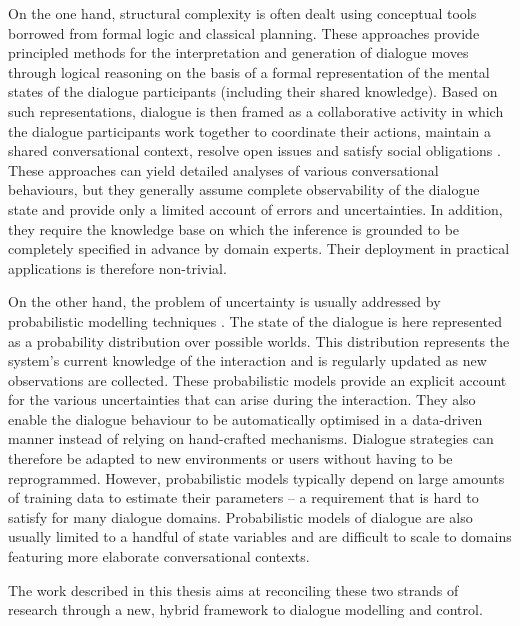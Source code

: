 On the one hand, structural complexity is often dealt using conceptual tools borrowed from formal logic and classical planning.  These approaches provide principled methods for the interpretation and generation of dialogue moves through logical reasoning on the basis of a formal representation of the mental states of the dialogue participants (including their shared knowledge). Based on such representations, dialogue is then framed as a collaborative activity in which the dialogue participants work together to coordinate their actions, maintain a shared conversational context, resolve open issues and satisfy social obligations  \citep{Allen:2000:AGD:973935.973937,larsson2002,Jokinen:2009}. These approaches can yield detailed analyses of various conversational behaviours, but they generally assume complete observability of the dialogue state and provide only a limited account of errors and uncertainties. In addition, they require the knowledge base on which the inference is grounded to be completely specified in advance by domain experts.  Their deployment in practical applications is therefore non-trivial. 

On the other hand, the problem of uncertainty is usually addressed by probabilistic modelling techniques \citep{Roy:2000,FramptonL09,Young:2010}.  The state of the dialogue is here represented as a probability distribution over possible worlds.  This distribution represents the system's current knowledge of the interaction and is regularly updated as new observations are collected. These probabilistic models provide an explicit account for the various uncertainties that can arise during the interaction. They also enable the dialogue behaviour to be automatically optimised in a data-driven manner instead of relying on hand-crafted mechanisms.  Dialogue strategies can therefore be adapted to new environments or users without having to be reprogrammed. However, probabilistic models typically depend on large amounts of training data to estimate their parameters -- a requirement that is hard to satisfy for many dialogue domains.  Probabilistic models of dialogue are also usually limited to a handful of state variables and are difficult to scale to domains featuring more elaborate conversational contexts. 

The work described in this thesis aims at reconciling these two strands of research through a new, hybrid framework to dialogue modelling and control. 

